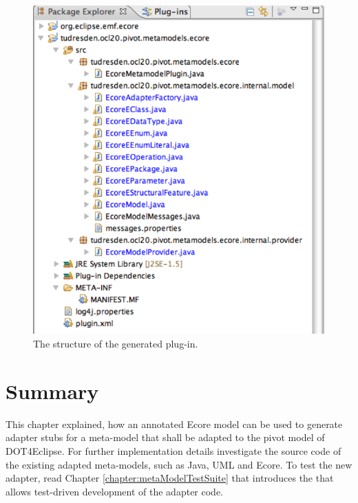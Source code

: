 \begin{figure}[!htbp]
	\centering
	\includegraphics[width=0.7\linewidth]{figures/pivotModelAdaption/GeneratedPlugin}
	\caption{The structure of the generated plug-in.}
	\label{pic:pivotModelAdaption:GeneratedPlugin}
\end{figure}



\section{Summary}

This chapter explained, how an annotated Ecore model can be used to generate adapter stubs for a meta-model that shall be adapted to the pivot model of \acl{DOT4Eclipse}. For further implementation details investigate the source code of the existing adapted meta-models, such as Java, \acs{UML} and Ecore. To test the new adapter, read Chapter \ref{chapter:metaModelTestSuite} that introduces the  that allows test-driven development of the adapter code.